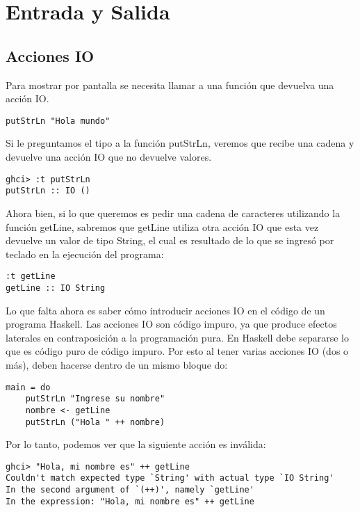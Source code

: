 \section{Entrada y Salida} %
\label{sec:entrada_y_salida}

\subsection{Acciones IO} %
\label{sub:acciones_io}

Para mostrar por pantalla se necesita llamar a una función que devuelva una acción IO.

\begin{lstlisting}
putStrLn "Hola mundo"
\end{lstlisting}

Si le preguntamos el tipo a la función putStrLn, veremos que recibe una cadena y devuelve una acción IO que no devuelve valores.

\begin{lstlisting}
ghci> :t putStrLn
putStrLn :: IO ()
\end{lstlisting}

Ahora bien, si lo que queremos es pedir una cadena de caracteres utilizando la función getLine, sabremos que getLine utiliza otra acción IO que esta vez devuelve un valor de tipo String, el cual es resultado de lo que se ingresó por teclado en la ejecución del programa:

\begin{lstlisting}
:t getLine
getLine :: IO String
\end{lstlisting}

Lo que falta ahora es saber cómo introducir acciones IO en el código de un programa Haskell.
Las acciones IO son código impuro, ya que produce efectos laterales en contraposición a la programación pura.
En Haskell debe separarse lo que es código puro de código impuro. Por esto al tener varias acciones IO (dos o más), deben hacerse dentro de un mismo bloque do:

\begin{lstlisting}
main = do
    putStrLn "Ingrese su nombre"
    nombre <- getLine
    putStrLn ("Hola " ++ nombre)
\end{lstlisting}

Por lo tanto, podemos ver que la siguiente acción es inválida:

\begin{lstlisting}
ghci> "Hola, mi nombre es" ++ getLine
Couldn't match expected type `String' with actual type `IO String'
In the second argument of `(++)', namely `getLine'
In the expression: "Hola, mi nombre es" ++ getLine
\end{lstlisting}

